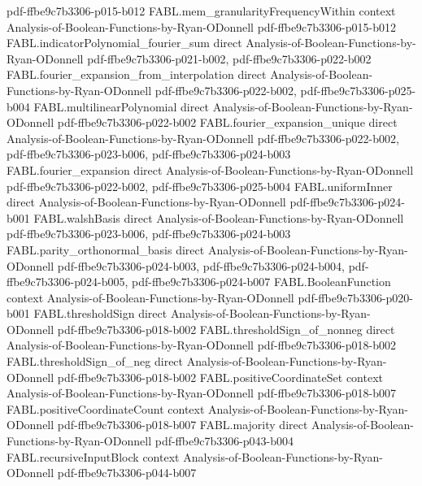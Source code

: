\begin{theorem}
  {pdf-ffbe9c7b3306-p015-b012}
\proofstep
  {FABL.mem_granularityFrequencyWithin}
  {context}
  {Analysis-of-Boolean-Functions-by-Ryan-ODonnell}
  {pdf-ffbe9c7b3306-p015-b012}
\proofstep
  {FABL.indicatorPolynomial_fourier_sum}
  {direct}
  {Analysis-of-Boolean-Functions-by-Ryan-ODonnell}
  {pdf-ffbe9c7b3306-p021-b002,
    pdf-ffbe9c7b3306-p022-b002}
\proofstep
  {FABL.fourier_expansion_from_interpolation}
  {direct}
  {Analysis-of-Boolean-Functions-by-Ryan-ODonnell}
  {pdf-ffbe9c7b3306-p022-b002,
    pdf-ffbe9c7b3306-p025-b004}
\proofstep
  {FABL.multilinearPolynomial}
  {direct}
  {Analysis-of-Boolean-Functions-by-Ryan-ODonnell}
  {pdf-ffbe9c7b3306-p022-b002}
\proofstep
  {FABL.fourier_expansion_unique}
  {direct}
  {Analysis-of-Boolean-Functions-by-Ryan-ODonnell}
  {pdf-ffbe9c7b3306-p022-b002,
    pdf-ffbe9c7b3306-p023-b006,
    pdf-ffbe9c7b3306-p024-b003}
\proofstep
  {FABL.fourier_expansion}
  {direct}
  {Analysis-of-Boolean-Functions-by-Ryan-ODonnell}
  {pdf-ffbe9c7b3306-p022-b002,
    pdf-ffbe9c7b3306-p025-b004}
\proofstep
  {FABL.uniformInner}
  {direct}
  {Analysis-of-Boolean-Functions-by-Ryan-ODonnell}
  {pdf-ffbe9c7b3306-p024-b001}
\proofstep
  {FABL.walshBasis}
  {direct}
  {Analysis-of-Boolean-Functions-by-Ryan-ODonnell}
  {pdf-ffbe9c7b3306-p023-b006,
    pdf-ffbe9c7b3306-p024-b003}
\proofstep
  {FABL.parity_orthonormal_basis}
  {direct}
  {Analysis-of-Boolean-Functions-by-Ryan-ODonnell}
  {pdf-ffbe9c7b3306-p024-b003,
    pdf-ffbe9c7b3306-p024-b004,
    pdf-ffbe9c7b3306-p024-b005,
    pdf-ffbe9c7b3306-p024-b007}
\proofstep
  {FABL.BooleanFunction}
  {context}
  {Analysis-of-Boolean-Functions-by-Ryan-ODonnell}
  {pdf-ffbe9c7b3306-p020-b001}
\proofstep
  {FABL.thresholdSign}
  {direct}
  {Analysis-of-Boolean-Functions-by-Ryan-ODonnell}
  {pdf-ffbe9c7b3306-p018-b002}
\proofstep
  {FABL.thresholdSign_of_nonneg}
  {direct}
  {Analysis-of-Boolean-Functions-by-Ryan-ODonnell}
  {pdf-ffbe9c7b3306-p018-b002}
\proofstep
  {FABL.thresholdSign_of_neg}
  {direct}
  {Analysis-of-Boolean-Functions-by-Ryan-ODonnell}
  {pdf-ffbe9c7b3306-p018-b002}
\proofstep
  {FABL.positiveCoordinateSet}
  {context}
  {Analysis-of-Boolean-Functions-by-Ryan-ODonnell}
  {pdf-ffbe9c7b3306-p018-b007}
\proofstep
  {FABL.positiveCoordinateCount}
  {context}
  {Analysis-of-Boolean-Functions-by-Ryan-ODonnell}
  {pdf-ffbe9c7b3306-p018-b007}
\proofstep
  {FABL.majority}
  {direct}
  {Analysis-of-Boolean-Functions-by-Ryan-ODonnell}
  {pdf-ffbe9c7b3306-p043-b004}
\proofstep
  {FABL.recursiveInputBlock}
  {context}
  {Analysis-of-Boolean-Functions-by-Ryan-ODonnell}
  {pdf-ffbe9c7b3306-p044-b007}

\end{theorem}
